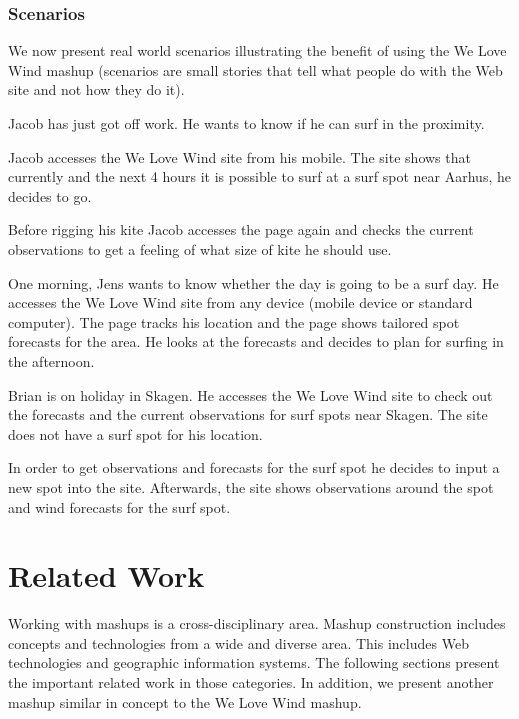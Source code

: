 \subsubsection{Scenarios}\label{sec:scenarios}
We now present real world scenarios illustrating the benefit of using the
We Love Wind mashup (scenarios are small stories that tell what people do with the
Web site and not how they do it).

\begin{scenario}\label{scenario:one}
  Jacob has just got off work. He wants to know if he can surf in the proximity.

  Jacob accesses the We Love Wind site from his mobile. The site shows that
  currently and the next 4 hours it is possible to surf at a surf spot near Aarhus, he
  decides to go.

  Before rigging his kite Jacob accesses the page again and checks the current
  observations to get a feeling of what size of kite he should use.
\end{scenario}

\begin{scenario}\label{scenario:two}
  One morning, Jens wants to know whether the day is going to be a surf day. He
  accesses the We Love Wind site from any device (mobile device or standard
  computer). The page tracks his location and the page shows tailored spot
  forecasts for the area. He looks at the forecasts and decides to plan for
  surfing in the afternoon.
\end{scenario}

\begin{scenario}
  Brian is on holiday in Skagen. He accesses the We Love Wind site to check
  out the forecasts and the current observations for surf spots near Skagen. The
  site does not have a surf spot for his location.

  In order to get observations and forecasts for the surf spot he decides to
  input a new spot into the site. Afterwards, the site shows observations around the
  spot and wind forecasts for the surf spot.
\end{scenario}

\section{Related Work}
Working with mashups is a cross-disciplinary area. Mashup construction includes
concepts and technologies from a wide and diverse area. This includes Web
technologies and geographic information systems. The following sections present
the important related work in those categories. In addition, we present another
mashup similar in concept to the We Love Wind mashup.
 
